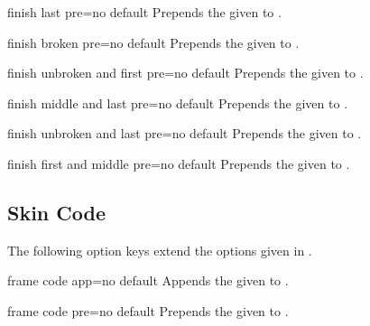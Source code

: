 \begin{docTcbKey}{finish last pre}{=}{no default}
  Prepends the given  to .
\end{docTcbKey}

\begin{docTcbKey}{finish broken pre}{=}{no default}
  Prepends the given  to .
\end{docTcbKey}

\begin{docTcbKey}{finish unbroken and first pre}{=}{no default}
  Prepends the given  to .
\end{docTcbKey}

\begin{docTcbKey}{finish middle and last pre}{=}{no default}
  Prepends the given  to .
\end{docTcbKey}

\begin{docTcbKey}{finish unbroken and last pre}{=}{no default}
  Prepends the given  to .
\end{docTcbKey}

\begin{docTcbKey}[][doc new=2014-09-19]{finish first and middle pre}{=}{no default}
  Prepends the given  to .
\end{docTcbKey}


\subsection{Skin Code}
The following option keys extend the options given in .

\begin{docTcbKey}{frame code app}{=}{no default}
  Appends the given  to .
\end{docTcbKey}

\begin{docTcbKey}{frame code pre}{=}{no default}
  Prepends the given  to .
\end{docTcbKey}

